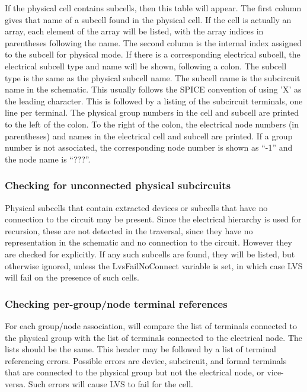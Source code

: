 If the physical cell contains subcells, then this table will appear. 
The first column gives that name of a subcell found in the physical
cell.  If the cell is actually an array, each element of the array
will be listed, with the array indices in parentheses following the
name.  The second column is the internal index assigned to the subcell
for physical mode.  If there is a corresponding electrical subcell,
the electrical subcell type and name will be shown, following a colon. 
The subcell type is the same as the physical subcell name.  The
subcell name is the subcircuit name in the schematic.  This usually
follows the SPICE convention of using 'X' as the leading character. 
This is followed by a listing of the subcircuit terminals, one line
per terminal.  The physical group numbers in the cell and subcell are
printed to the left of the colon.  To the right of the colon, the
electrical node numbers (in parentheses) and names in the electrical
cell and subcell are printed.  If a group number is not associated,
the corresponding node number is shown as ``-1'' and the node name is
``???''.

\subsubsection{Checking for unconnected physical subcircuits}

Physical subcells that contain extracted devices or subcells that have
no connection to the circuit may be present.  Since the electrical
hierarchy is used for recursion, these are not detected in the
traversal, since they have no representation in the schematic and no
connection to the circuit.  However they are checked for explicitly. 
If any such subcells are found, they will be listed, but otherwise
ignored, unless the {\et LvsFailNoConnect} variable is set, in which
case LVS will fail on the presence of such cells.

\subsubsection{Checking per-group/node terminal references}

For each group/node association, {\Xic} will compare the list of
terminals connected to the physical group with the list of terminals
connected to the electrical node.  The lists should be the same.  This
header may be followed by a list of terminal referencing errors. 
Possible errors are device, subcircuit, and formal terminals that are
connected to the physical group but not the electrical node, or
vice-versa.  Such errors will cause LVS to fail for the cell.

